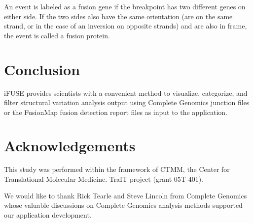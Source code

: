 An event is labeled as a fusion gene if the breakpoint has two different genes on either side. If the two sides also have the same orientation (are on the same strand, or in the case of an inversion on opposite strands) and are also in frame, the event is called a fusion protein.

\section*{Conclusion}

iFUSE provides scientists with a convenient method to visualize, categorize, and filter structural variation analysis output using Complete Genomics junction files or the FusionMap fusion detection report files as input to the application.

\section*{Acknowledgements}

This study was performed within the framework of CTMM, the Center for Translational Molecular Medicine. TraIT project (grant 05T-401).

We would like to thank Rick Tearle and Steve Lincoln from Complete Genomics whose valuable discussions on Complete Genomics analysis methods supported our application development.





